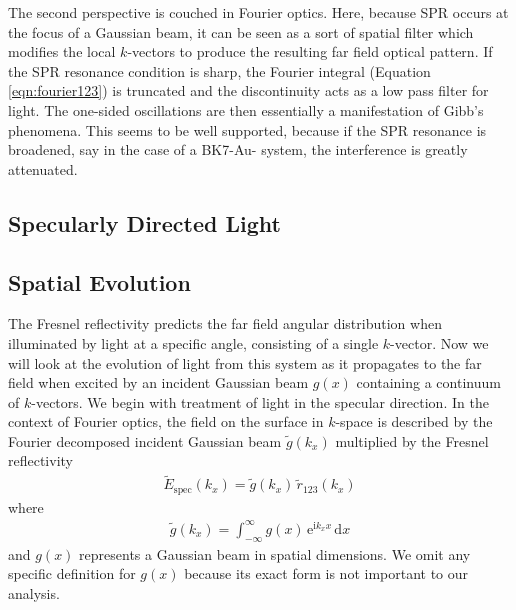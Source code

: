 \documentclass[a4paper,titlepage,onecolumn]{report}
\newcommand{\intinfty}{\int_{-\infty}^{\infty}}
\newcommand{\Equation}[1]{Equation \ref{#1}}
\newcommand{\me}{{\mathrm{e}}}
\newcommand{\mi}{{\mathrm{i}}}
\newcommand{\md}{\,\mathrm{d}}
\begin{document}
The second perspective is couched in Fourier optics.  Here, because
SPR occurs at the focus of a Gaussian beam, it can be seen as a sort of
spatial filter which modifies the local $k$-vectors to produce
the resulting far field optical pattern.  If the SPR resonance condition is
sharp, the Fourier integral (\Equation{eqn:fourier123}) is truncated and
the discontinuity acts as a low pass filter for light.  The one-sided
oscillations are then essentially a manifestation of Gibb's phenomena.
This seems to be well supported, because if the SPR resonance is broadened,
say in the case of a BK7-Au- system, the interference is greatly
attenuated.
%

\subsection{Specularly Directed Light}


\subsection{Spatial Evolution}
The Fresnel reflectivity predicts the far field angular distribution when
illuminated by light at a specific angle, consisting of a single
$k$-vector.  Now we will look at the evolution of light from this system
as it propagates to the far field when excited by an incident Gaussian beam
$g(x)$ containing a continuum of $k$-vectors.  We begin with treatment of
light in the specular direction.  In the context of Fourier
optics, the field on the surface in $k$-space is described by the Fourier
decomposed incident Gaussian beam $\tilde{g}(k_x)$ multiplied by the
Fresnel reflectivity
\begin{align}
\tilde{E}_\text{spec}(k_x)=\tilde{g}(k_x)\,\tilde{r}_\text{123}(k_x)
\end{align}
where
\begin{align}
\tilde{g}(k_x) = \intinfty g(x)\, \me^{\mi k_x x} \md x
\end{align}
and $g(x)$ represents a Gaussian beam in spatial dimensions.  We omit any 
specific definition for $g(x)$ because its exact form
is not important to our analysis.
\end{document}
